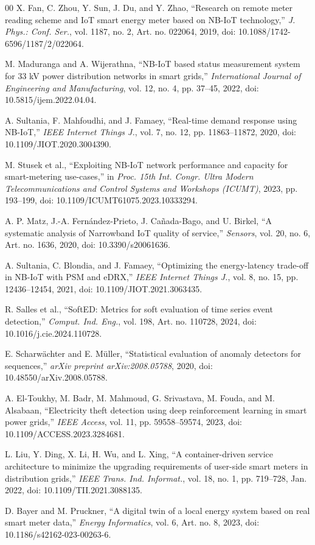 \documentclass{ieeeaccess}
\begin{document}
\begin{thebibliography}{00}
X. Fan, C. Zhou, Y. Sun, J. Du, and Y. Zhao,
``Research on remote meter reading scheme and IoT smart energy meter based on NB-IoT technology,''
\textit{J. Phys.: Conf. Ser.},
vol. 1187, no. 2, Art. no. 022064, 2019,
doi: 10.1088/1742-6596/1187/2/022064.

M. Maduranga and A. Wijerathna,
``NB-IoT based status measurement system for 33 kV power distribution networks in smart grids,''
\textit{International Journal of Engineering and Manufacturing},
vol. 12, no. 4, pp. 37--45, 2022,
doi: 10.5815/ijem.2022.04.04.

A. Sultania, F. Mahfoudhi, and J. Famaey,
``Real-time demand response using NB-IoT,''
\textit{IEEE Internet Things J.},
vol. 7, no. 12, pp. 11863--11872, 2020,
doi: 10.1109/JIOT.2020.3004390.

M. Stusek et al.,
``Exploiting NB-IoT network performance and capacity for smart-metering use-cases,''
in \textit{Proc. 15th Int. Congr. Ultra Modern Telecommunications and Control Systems and Workshops (ICUMT)},
2023, pp. 193--199,
doi: 10.1109/ICUMT61075.2023.10333294.

A. P. Matz, J.-A. Fernández-Prieto, J. Cañada-Bago, and U. Birkel,
``A systematic analysis of Narrowband IoT quality of service,''
\textit{Sensors},
vol. 20, no. 6, Art. no. 1636, 2020,
doi: 10.3390/s20061636.

A. Sultania, C. Blondia, and J. Famaey,
``Optimizing the energy-latency trade-off in NB-IoT with PSM and eDRX,''
\textit{IEEE Internet Things J.},
vol. 8, no. 15, pp. 12436--12454, 2021,
doi: 10.1109/JIOT.2021.3063435.

R. Salles et al.,
``SoftED: Metrics for soft evaluation of time series event detection,''
\textit{Comput. Ind. Eng.},
vol. 198, Art. no. 110728, 2024,
doi: 10.1016/j.cie.2024.110728.

E. Scharwächter and E. Müller,
``Statistical evaluation of anomaly detectors for sequences,''
\textit{arXiv preprint arXiv:2008.05788}, 2020,
doi: 10.48550/arXiv.2008.05788.

A. El-Toukhy, M. Badr, M. Mahmoud, G. Srivastava, M. Fouda, and M. Alsabaan,
``Electricity theft detection using deep reinforcement learning in smart power grids,''
\textit{IEEE Access},
vol. 11, pp. 59558--59574, 2023,
doi: 10.1109/ACCESS.2023.3284681.


L. Liu, Y. Ding, X. Li, H. Wu, and L. Xing,
``A container-driven service architecture to minimize the upgrading requirements of user-side smart meters in distribution grids,''
\textit{IEEE Trans. Ind. Informat.},
vol. 18, no. 1, pp. 719--728, Jan. 2022,
doi: 10.1109/TII.2021.3088135.

D. Bayer and M. Pruckner,
``A digital twin of a local energy system based on real smart meter data,''
\textit{Energy Informatics},
vol. 6, Art. no. 8, 2023,
doi: 10.1186/s42162-023-00263-6.

\end{thebibliography}
\end{document}
